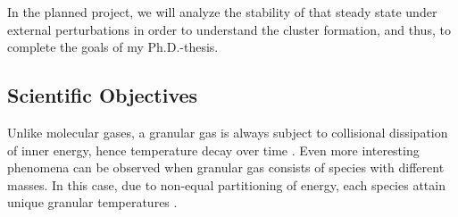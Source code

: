 \documentclass[11pt, notitlepage]{article} %
\begin{document}
In the planned project, we will analyze the stability of that steady state under external perturbations in order to understand the
cluster formation, and thus, to complete the goals of my Ph.D.-thesis.\\

\subsection*{Scientific Objectives}
Unlike molecular gases, a granular gas is always subject to collisional dissipation of inner 
energy, hence temperature decay over time \citep{Haff1983, Brilliantov2004}. Even more interesting phenomena can be
observed when granular gas consists of species with different masses. In this case, 
due to non-equal partitioning of energy, each species attain unique granular
temperatures \citep{Garzo2007c, Osinsky2020}. 
\end{document}
